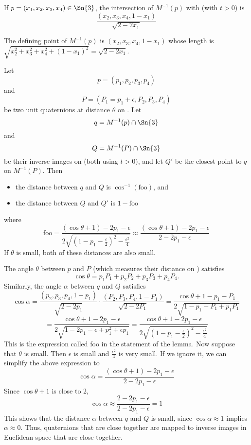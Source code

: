 \begin{lemma}
If $p = (x_{1}, x_{2}, x_{3}, x_{4}) \in \Sn{3}$, the intersection
of $M^{-1}(p)$ with  (with $t>0$) is
\[
\frac{(x_{2}, x_{3}, x_{4}, 1 - x_{1})}{\sqrt{2-2x_{1}}}
\]
\end{lemma}
\prf
The defining point of $M^{-1}(p)$ is $(x_{2}, x_{3}, x_{4}, 1 - x_{1})$
whose length is 
$\sqrt{x_{2}^2 + x_{3}^2 + x_{4}^2 + (1 - x_{1})^2}
= \sqrt{2-2x_{1}}$.
\QED

\begin{lemma}
\label{lem:goodapprox}
Let 
\[ p=(p_1,p_2,p_3,p_4)
\]
and 
\[
P=(P_1 = p_1+\epsilon,P_2,P_3,P_4)
\]
be two unit quaternions at distance $\theta$ on .
Let 
\[ 
q = M^{-1}(p) \cap \Sn{3}
\]
and 
\[
Q = M^{-1}(P) \cap \Sn{3}
\]
be their inverse images on  (both using $t>0$),
and let $Q'$ be the closest point to $q$ on $M^{-1}(P)$.
Then
\begin{itemize}
\item	the distance between $q$ and $Q$ is $\cos^{-1}(\mbox{foo})$, and
\item	the distance between $Q$ and $Q'$ is $1 - \mbox{foo}$
\end{itemize}
where
\[
	\mbox{foo} = \frac{(\cos \theta + 1) - 2p_1 - \epsilon}
{2\sqrt{(1-p_1-\frac{\epsilon}{2})^2 - \frac{\epsilon^2}{4}}}
	\approx \frac{(\cos \theta + 1) - 2p_1 - \epsilon}
			  {2 - 2p_1 - \epsilon}
\]
If $\theta$ is small, both of these distances are also small.
\end{lemma}
\prf
The angle $\theta$ between $p$ and $P$ (which measures their distance on )
satisfies 
\[	
	\cos \theta = p_1P_1 + p_2P_2 + p_3P_3 + p_4P_4.
\]
Similarly, the angle $\alpha$ between $q$ and $Q$ satisfies
\[
	\cos \alpha = \frac{(p_2,p_3,p_4,1-p_1)}{\sqrt{2-2p_1}}
	\cdot
	\frac{(P_2,P_3,P_4,1-P_1)}{\sqrt{2-2P_1}}
	= \frac{\cos \theta + 1 - p_1 - P_1}
	       {2\sqrt{1-p_1-P_1+p_1P_1}}
\]
\[
	= \frac{\cos \theta + 1 - 2p_1 - \epsilon}
	       {2\sqrt{1-2p_1-\epsilon+p_1^2 + \epsilon p_1}}
	= \frac{\cos \theta + 1 - 2p_1 - \epsilon}
	       {2\sqrt{(1-p_1-\frac{\epsilon}{2})^2 - \frac{\epsilon^2}{4}}}
\]
This is the expression called foo in the statement of the lemma.
Now suppose that $\theta$ is small.
Then $\epsilon$ is small and $\frac{\epsilon^2}{4}$ is very small.
If we ignore it, we can simplify the above expression to
\[
	\cos \alpha 
	       	    = \frac{(\cos \theta + 1) - 2p_1 - \epsilon}
	       {2 - 2p_1 - \epsilon}
\]
Since $\cos \theta + 1$ is close to 2, 
\[
	\cos \alpha \approx 
	\frac{2 - 2p_1 - \epsilon}{2 - 2p_1 - \epsilon} = 1
\]
This shows that the distance $\alpha$ between $q$ and $Q$ is
small, since $\cos \alpha \approx 1$ implies $\alpha \approx 0$.
Thus, quaternions that are close together are mapped to
inverse images in Euclidean space that are close together.

